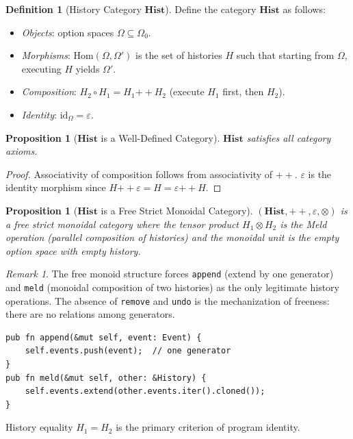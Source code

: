 \documentclass[12pt, a4paper, openany]{book}
\theoremstyle{plain}
\newtheorem{proposition}[theorem]{Proposition}
\theoremstyle{definition}
\newtheorem{definition}[theorem]{Definition}
\theoremstyle{remark}
\newtheorem{remark}[theorem]{Remark}
\newcommand{\Hist}{\mathbf{Hist}}
\begin{document}
\begin{definition}[History Category $\Hist$]
Define the category $\Hist$ as follows:
\begin{itemize}
\item \textit{Objects}: option spaces $\Omega \subseteq \Omega_0$.
\item \textit{Morphisms}: $\mathrm{Hom}(\Omega, \Omega')$ is the set of histories
$H$ such that starting from $\Omega$, executing $H$ yields $\Omega'$.
\item \textit{Composition}: $H_2 \circ H_1 = H_1 \mathbin{++} H_2$ (execute
$H_1$ first, then $H_2$).
\item \textit{Identity}: $\mathrm{id}_\Omega = \varepsilon$.
\end{itemize}
\end{definition}

\begin{proposition}[$\Hist$ is a Well-Defined Category]
$\Hist$ satisfies all category axioms.
\end{proposition}

\begin{proof}
Associativity of composition follows from associativity of $\mathbin{++}$.
$\varepsilon$ is the identity morphism since $H \mathbin{++} \varepsilon = H =
\varepsilon \mathbin{++} H$.
\end{proof}

\begin{proposition}[$\Hist$ is a Free Strict Monoidal Category]
$(\Hist, \mathbin{++}, \varepsilon, \otimes)$ is a free strict monoidal category
where the tensor product $H_1 \otimes H_2$ is the Meld operation (parallel
composition of histories) and the monoidal unit is the empty option space with
empty history.
\end{proposition}

\begin{remark}
The free monoid structure forces \texttt{append} (extend by one generator) and
\texttt{meld} (monoidal composition of two histories) as the only legitimate
history operations. The absence of \texttt{remove} and \texttt{undo} is the
mechanization of freeness: there are no relations among generators.
\begin{lstlisting}[style=rust, caption={History as free monoid in Rust}]
pub fn append(&mut self, event: Event) {
    self.events.push(event);  // one generator
}
pub fn meld(&mut self, other: &History) {
    self.events.extend(other.events.iter().cloned());
}
\end{lstlisting}
History equality $H_1 = H_2$ is the primary criterion of program identity.
\end{remark}
\end{document}
